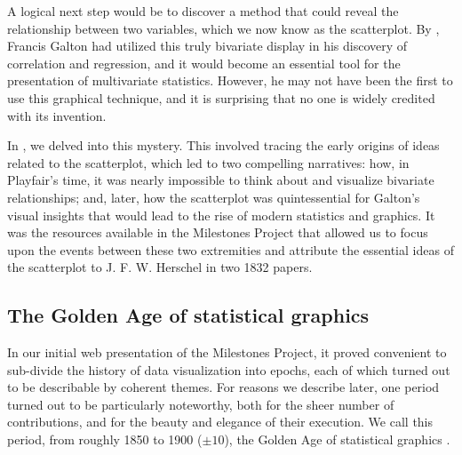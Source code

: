 A logical next step would be to discover a method that could reveal the relationship between two variables, which we now know as the scatterplot.  By \citeyear{Galton:1886}, Francis Galton had utilized this truly bivariate display in his discovery of correlation and regression, and it would become an essential tool for the presentation of multivariate statistics. However, he may not have been the first to use this graphical technique, and it is surprising that no one is widely credited with its invention.

In \citet{FriendlyDenis:05:scat}, we delved into this mystery.  This involved tracing the early origins of ideas related to the scatterplot, which led to two compelling narratives: how, in Playfair's time, it was nearly impossible to think about and visualize bivariate relationships; and, later, how the scatterplot was quintessential for Galton's visual insights that would lead to the rise of modern statistics and graphics. It was the resources available in the Milestones Project that allowed us to focus upon the events between these two extremities and attribute the essential ideas of the scatterplot to J. F. W. Herschel in two 1832 papers.

\subsection{The Golden Age of statistical graphics}

In our initial web presentation of the Milestones Project, it proved convenient
to sub-divide the history of data visualization into epochs, each of which turned
out to be describable by coherent themes.  For reasons we describe later, one
period turned out to be particularly noteworthy, both for the sheer number of
contributions, and for the beauty and elegance of their execution. We call this period, from roughly 1850 to 1900 ($\pm 10$), the Golden Age of statistical graphics \citep{Friendly:2008:golden}.

